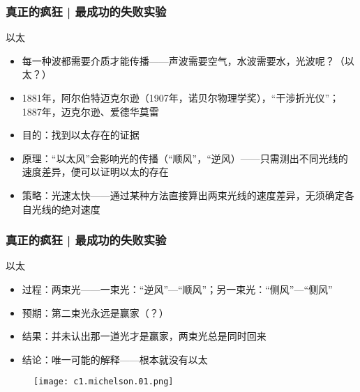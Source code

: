 \begin{frame}
  \frametitle{真正的疯狂 | 最成功的失败实验}
  \begin{block}{以太}
    \begin{itemize}
      \item 每一种波都需要介质才能传播——声波需要空气，水波需要水，光波呢？（以太？）
      \item 1881年，阿尔伯特\textbullet 迈克尔逊（1907年，诺贝尔物理学奖），“干涉折光仪”；1887年，迈克尔逊、爱德华\textbullet 莫雷
      \item 目的：找到以太存在的证据
      \item 原理：“以太风”会影响光的传播（“顺风”，“逆风）——只需测出不同光线的速度差异，便可以证明以太的存在
      \item 策略：光速太快——通过某种方法直接算出两束光线的速度差异，无须确定各自光线的绝对速度
    \end{itemize}
  \end{block}
\end{frame}

\begin{frame}
  \frametitle{真正的疯狂 | 最成功的失败实验}
  \begin{block}{以太}
    \begin{itemize}
      \item 过程：两束光——一束光：“逆风”—“顺风”；另一束光：“侧风”—“侧风”
      \item 预期：第二束光永远是赢家（？）
      \item 结果：并未认出那一道光才是赢家，两束光总是同时回来
      \item 结论：唯一可能的解释——根本就没有以太
    \end{itemize}
  \end{block}
  \vspace{-0.5em}
  \begin{figure}
    \centering
    \texttt{[image: c1.michelson.01.png]}
  \end{figure}
\end{frame}

